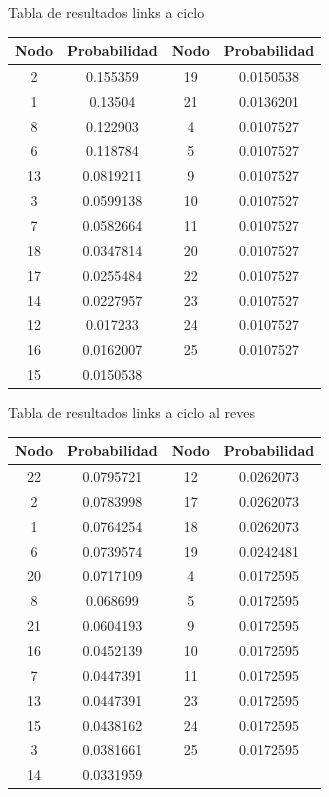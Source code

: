 \par Tabla de resultados links a ciclo
\begin{table}
	\begin{tabular}{|c|c|c|c|}
		\hline
		Nodo & Probabilidad & Nodo & Probabilidad \\ \hline
		2    & 0.155359     & 19   & 0.0150538    \\
		1    & 0.13504      & 21   & 0.0136201    \\
		8    & 0.122903     & 4    & 0.0107527    \\
		6    & 0.118784     & 5    & 0.0107527    \\
		13   & 0.0819211    & 9    & 0.0107527    \\
		3    & 0.0599138    & 10   & 0.0107527    \\
		7    & 0.0582664    & 11   & 0.0107527    \\
		18   & 0.0347814    & 20   & 0.0107527    \\
		17   & 0.0255484    & 22   & 0.0107527    \\
		14   & 0.0227957    & 23   & 0.0107527    \\
		12   & 0.017233     & 24   & 0.0107527    \\
		16   & 0.0162007    & 25   & 0.0107527    \\
		15   & 0.0150538    & ~    & ~            \\ \hline
	\end{tabular}
\end{table}

\par Tabla de resultados links a ciclo al reves
\begin{table}
	\begin{tabular}{|c|c|c|c|}
		\hline
		Nodo & Probabilidad & Nodo & Probabilidad \\ \hline
		22   & 0.0795721    & 12   & 0.0262073    \\
		2    & 0.0783998    & 17   & 0.0262073    \\
		1    & 0.0764254    & 18   & 0.0262073    \\
		6    & 0.0739574    & 19   & 0.0242481    \\
		20   & 0.0717109    & 4    & 0.0172595    \\
		8    & 0.068699     & 5    & 0.0172595    \\
		21   & 0.0604193    & 9    & 0.0172595    \\
		16   & 0.0452139    & 10   & 0.0172595    \\
		7    & 0.0447391    & 11   & 0.0172595    \\
		13   & 0.0447391    & 23   & 0.0172595    \\
		15   & 0.0438162    & 24   & 0.0172595    \\
		3    & 0.0381661    & 25   & 0.0172595    \\
		14   & 0.0331959    & ~    & ~            \\ \hline
	\end{tabular}
\end{table}